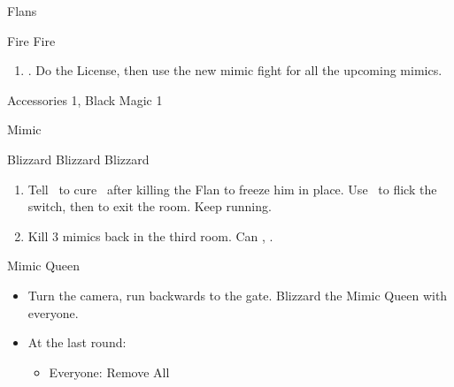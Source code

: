 \begin{battle}{Flans}
	\begin{itemize}
		\franf Fire
		\vaanf Fire
	\end{itemize}
\end{battle}
\begin{enumerate}
	\item {}. Do the License, then use the new mimic fight for all the upcoming mimics.
\end{enumerate}
\begin{liscense}
	\begin{itemize}
		\balthierf Accessories 1, Black Magic 1
	\end{itemize}
\end{liscense}
\begin{battle}{Mimic}
	\begin{itemize}
		\franf Blizzard
		\balthierf Blizzard
		\vaanf Blizzard
	\end{itemize}
\end{battle}
\begin{enumerate}
	\item {} Tell \balthier\ to cure \vaan\ after killing the Flan to freeze him in place. Use \vaan\ to flick the switch, then \leader{\balthier} to exit the room. Keep running.
	\item {} Kill 3 mimics back in the third room. Can  \save, \leader{\vaan}.
\end{enumerate}
\begin{battle}{Mimic Queen}
	\begin{itemize}
		\item Turn the camera, run backwards to the gate. Blizzard the Mimic Queen with everyone.
		\item At the last round:
		      \begin{equip}
			      \begin{itemize}
				      \item Everyone: Remove All
			      \end{itemize}
		      \end{equip}
	\end{itemize}
\end{battle}